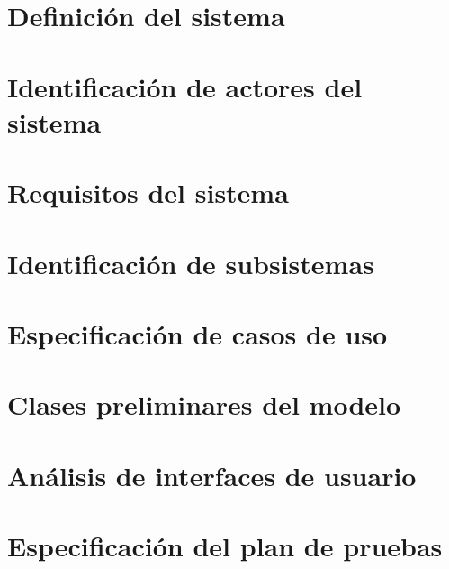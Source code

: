 \section{Definición del sistema}
\label{definicion_sistema}



\section{Identificación de actores del sistema}
\label{identificacion_actores}



\section{Requisitos del sistema}
\label{requisitos_sistema}



\section{Identificación de subsistemas}
\label{identificacion_subsistemas}



\section{Especificación de casos de uso}
\label{especificacion_casos_uso}



\section{Clases preliminares del modelo}
\label{clases_preliminares_modelo}



\section{Análisis de interfaces de usuario}
\label{analisis_interfaces_usuario}



\section{Especificación del plan de pruebas}
\label{especificacion_plan_pruebas}
